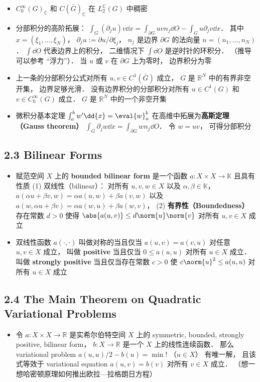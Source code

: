 \begin{itemize}
\item $C_0^\infty(G)_{\mathbb C}$ 和 $C(\bar G)_{\mathbb C}$  在 $L_2^{\mathbb C}(G)$ 中稠密

\item 分部积分的高阶拓展： $\int_G (\partial_j u) v\dd{x} = \int_{\partial G} uvn_j \dd{O} - \int_G u \partial_j v\dd{x}$． 其中 $x = (\xi_1, \dots, \xi_N)$， $\partial_j u := \partial u/\partial\xi_j$， $n_j$ 是边界 $\partial G$ 的法向量 $n = (n_1, \dots, n_N)$． $\int\dd{O}$ 代表边界上的积分， 二维情况下 $\int\dd{O}$ 是逆时针的环积分． （推导可以参考 “浮力”）． 当 $u$ 或 $v$ 在 $\partial G$ 上为零时， 边界积分为零

\item 上一条的分部积分公式对所有 $u, v \in C^1(\bar G)$ 成立， $G$ 是 $\mathbb R^N$ 中的有界非空开集， 边界足够光滑． 没有边界积分的分部积分对所有 $u \in C^1(G)$ 和 $v \in C_0^\infty(G)$ 成立． $G$ 是 $\mathbb R^N$ 中的一个非空开集

\item 微积分基本定理 $\int_a^b w' \dd{x} = \eval{w}_a^b$ 在高维中拓展为\textbf{高斯定理（Gauss theorem）} $\int_G \partial_j w \dd{x} = \int_{\partial G} wn_j\dd{O}$． 令 $w = uv$， 可得分部积分
\end{itemize}

\subsection{2.3 Bilinear Forms}
\begin{itemize}
\item 赋范空间 $X$ 上的 \textbf{bounded bilinear form} 是一个函数 $a: X\times X\to\mathbb K$ 且具有性质 (1) 双线性（bilinear）： 对所有 $u, v, w\in X$ 以及 $\alpha, \beta \in \mathbb K$， $a(\alpha u + \beta v, w) = \alpha a(u, w) + \beta a(v, w)$ 以及 $a(w, \alpha u + \beta v) = \alpha a(w, u) + \beta a(w, v)$， (2) \textbf{有界性（Boundedness）} 存在常数 $d > 0$ 使得 $\abs{a(u, v)} \le d\norm{u}\norm{v}$ 对所有 $u, v\in X$ 成立

\item 双线性函数 $a(\cdot,\cdot)$ 叫做对称的当且仅当 $a(u, v) = a(v, u)$ 对任意 $u, v\in X$ 成立， 叫做 \textbf{positive} 当且仅当 $0\le a(u,u)$ 对所有 $u\in X$ 成立． 叫做 \textbf{strongly positive} 当且仅当存在常数 $c > 0$ 使 $c\norm{u}^2 \le a(u, u)$ 对所有 $u\in X$ 成立
\end{itemize}

\subsection{2.4 The Main Theorem on Quadratic Variational Problems}
\begin{itemize}
\item 令 $a: X\times X\to\mathbb R$ 是实希尔伯特空间 $X$ 上的 symmetric, bounded, strongly positive, bilinear form， $b: X\to\mathbb R$ 是一个 $X$ 上的线性连续函数． 那么 variational problem $a(u, u)/2 - b(u) = \min!$ （$u\in X$） 有唯一解， 且该式等效于 variational equation $a(u, v) = b(v)$ 对所有 $v\in X$ 成立． （想一想哈密顿原理如何推出欧拉—拉格朗日方程）
\end{itemize}

